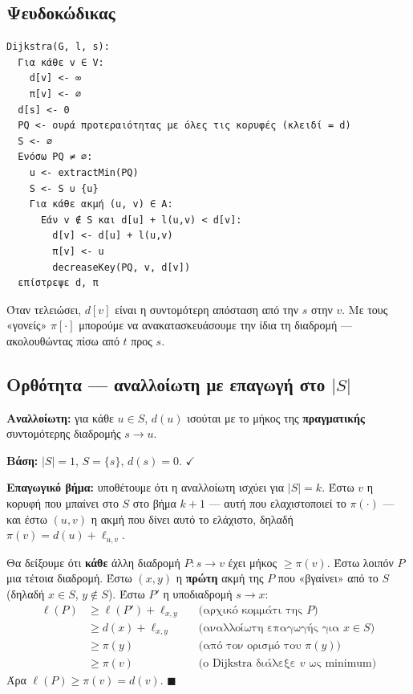 \documentclass[11pt,a4paper]{article}
\begin{document}
\subsection{Ψευδοκώδικας}

\begin{codebox}
\begin{verbatim}
Dijkstra(G, l, s):
  Για κάθε v ∈ V:
    d[v] <- ∞
    π[v] <- ∅
  d[s] <- 0
  PQ <- ουρά προτεραιότητας με όλες τις κορυφές (κλειδί = d)
  S <- ∅
  Ενόσω PQ ≠ ∅:
    u <- extractMin(PQ)
    S <- S ∪ {u}
    Για κάθε ακμή (u, v) ∈ A:
      Εάν v ∉ S και d[u] + l(u,v) < d[v]:
        d[v] <- d[u] + l(u,v)
        π[v] <- u
        decreaseKey(PQ, v, d[v])
  επίστρεψε d, π
\end{verbatim}
\end{codebox}

Όταν τελειώσει, $d[v]$ είναι η συντομότερη απόσταση από την $s$ στην $v$. Με
τους «γονείς» $\pi[\cdot]$ μπορούμε να ανακατασκευάσουμε την ίδια τη διαδρομή ---
ακολουθώντας πίσω από $t$ προς $s$.

\subsection{Ορθότητα --- αναλλοίωτη με επαγωγή στο $|S|$}

\begin{keypoint}
\textbf{Αναλλοίωτη:} για κάθε $u \in S$, $d(u)$ ισούται με το μήκος της
\textbf{πραγματικής} συντομότερης διαδρομής $s \to u$.
\end{keypoint}

\textbf{Βάση:} $|S| = 1$, $S = \{s\}$, $d(s) = 0$. $\checkmark$

\textbf{Επαγωγικό βήμα:} υποθέτουμε ότι η αναλλοίωτη ισχύει για $|S| = k$. Έστω
$v$ η κορυφή που μπαίνει στο $S$ στο βήμα $k+1$ --- αυτή που ελαχιστοποιεί το
$\pi(\cdot)$ --- και έστω $(u, v)$ η ακμή που δίνει αυτό το ελάχιστο, δηλαδή
$\pi(v) = d(u) + \ell_{u,v}$.

Θα δείξουμε ότι \textbf{κάθε} άλλη διαδρομή $P : s \to v$ έχει μήκος
$\ge \pi(v)$. Έστω λοιπόν $P$ μια τέτοια διαδρομή. Έστω $(x, y)$ η
\textbf{πρώτη} ακμή της $P$ που «βγαίνει» από το $S$ (δηλαδή $x \in S$,
$y \notin S$). Έστω $P'$ η υποδιαδρομή $s \to x$:
\[
\begin{aligned}
\ell(P) &\ge \ell(P') + \ell_{x,y} && \text{(αρχικό κομμάτι της } P\text{)} \\
        &\ge d(x) + \ell_{x,y}     && \text{(αναλλοίωτη επαγωγής για } x \in S
\text{)} \\
        &\ge \pi(y)                && \text{(από τον ορισμό του } \pi(y)
\text{)} \\
        &\ge \pi(v)                && \text{(ο Dijkstra διάλεξε } v \text{ ως
minimum)}
\end{aligned}
\]
Άρα $\ell(P) \ge \pi(v) = d(v)$. $\blacksquare$
\end{document}
